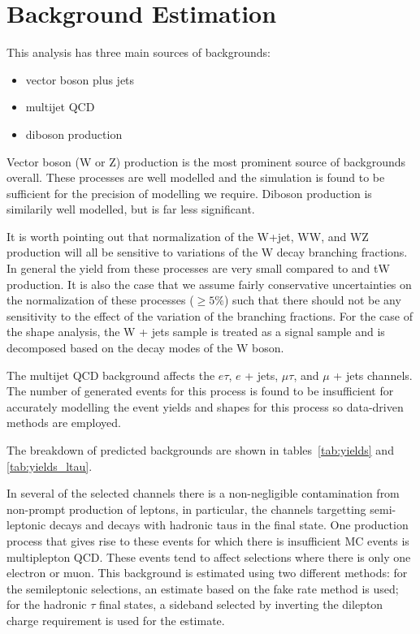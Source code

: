 \section{Background Estimation}
\label{sec:analysis:background}





This analysis has three main sources of backgrounds:

\begin{itemize}
    \item vector boson plus jets
    \item multijet QCD
    \item diboson production
\end{itemize}

Vector boson (W or Z) production is the most prominent source of backgrounds overall.  These processes are well modelled and the simulation is found to be sufficient for the precision of modelling we require.  Diboson production is similarily well modelled, but is far less significant.  

It is worth pointing out that normalization of the W+jet, WW, and WZ production will all be sensitive to variations of the W decay branching fractions.  In general the yield from these processes are very small compared to \ttbar and tW production.  It is also the case that we assume fairly conservative uncertainties on the normalization of these processes ($\geq 5\%$) such that there should not be any sensitivity to the effect of the variation of the branching fractions.  For the case of the shape analysis, the W + jets sample is treated as a signal sample and is decomposed based on the decay modes of the W boson.  

The multijet QCD background affects the $e\tau$, $e$ + jets, $\mu\tau$, and $\mu$ + jets channels.  The number of generated events for this process is found to be insufficient for accurately modelling the event yields and shapes for this process so data-driven methods are employed.

The breakdown of predicted backgrounds are shown in tables~\ref{tab:yields} and \ref{tab:yields_ltau}.   


In several of the selected channels there is a non-negligible contamination from non-prompt production of leptons, in particular, the channels targetting semi-leptonic \ttbar decays and decays with hadronic taus in the final state.  One production process that gives rise to these events for which there is insufficient MC events is multiplepton QCD.  These events tend to affect selections where there is only one electron or muon.  This background is estimated using two different methods: for the semileptonic \ttbar selections, an estimate based on the fake rate method is used; for the hadronic $\tau$ final states, a sideband selected by inverting the dilepton charge requirement is used for the estimate.



